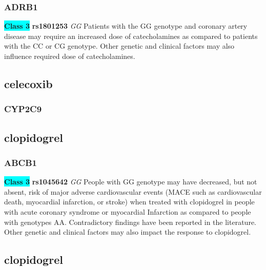 \documentclass{book}
\begin{document}
\subsubsection{ ADRB1 }

\begin{center}
\textbf{\colorbox{cyan} {Class 3}} \textbf{ rs1801253 } \textit{ GG }
Patients with the GG genotype and coronary artery disease may require an increased dose of catecholamines as compared to patients with the CC or CG genotype. Other genetic and clinical factors may also influence required dose of catecholamines.


\end{center}\subsection{ celecoxib }


\subsubsection{ CYP2C9 }

\begin{center}



\end{center}\subsection{ clopidogrel }


\subsubsection{ ABCB1 }

\begin{center}
\textbf{\colorbox{cyan} {Class 3}} \textbf{ rs1045642 } \textit{ GG }
People with GG  genotype may have decreased, but not absent, risk of major adverse cardiovascular events (MACE such as cardiovascular death, myocardial infarction, or stroke) when treated with clopidogrel in people with acute coronary syndrome or myocardial Infarction as compared to people with genotypes AA. Contradictory findings have been reported in the literature. Other genetic and clinical factors may also impact the response to clopidogrel.


\end{center}\subsection{ clopidogrel }
\end{document}
